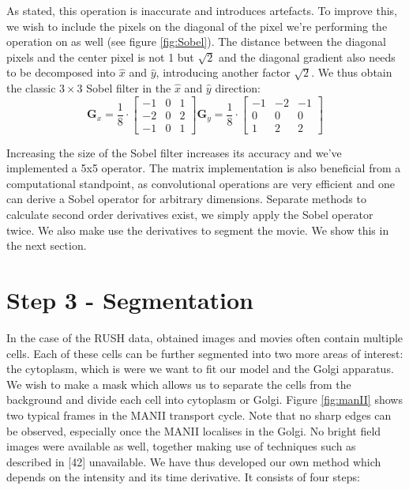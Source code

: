 \documentclass{Dissertate}
\begin{document}
As stated, this operation is inaccurate and introduces artefacts. To
improve this, we wish to include the pixels on the diagonal of the pixel
we're performing the operation on as well (see figure
\ref{fig:Sobel}). The distance between the diagonal pixels and the
center pixel is not 1 but \(\sqrt{2}\) and the diagonal gradient also
needs to be decomposed into \(\hat{x}\) and \(\hat{y}\), introducing
another factor \(\sqrt{2}\). We thus obtain the classic
\(3\times3\) Sobel filter in the $\hat{x}$ and $\hat{y}$ direction:  \[
\mathbf G_x=\frac{1}{8}\cdot
\begin{bmatrix}
-1 & 0 & 1\\
-2 & 0 & 2\\
-1 & 0 & 1
\end{bmatrix}
\mathbf G_y=\frac{1}{8}\cdot
\begin{bmatrix}
-1 & -2 & -1\\
0 & 0 & 0\\
1 & 2 & 2
\end{bmatrix}
\]

Increasing the size of the Sobel filter increases its accuracy and we've
implemented a 5x5 operator. The matrix implementation is also beneficial from a computational standpoint, as convolutional operations are very efficient and one can derive a Sobel operator for arbitrary dimensions. Separate methods to calculate second order derivatives exist, we simply apply the Sobel operator twice. We also make use the derivatives to segment the movie. We show this in the next section. 


\hypertarget{step-3---segmentation}{%
\section{Step 3 - Segmentation}\label{step-3---segmentation}}

In the case of the RUSH data, obtained images and movies often contain
multiple cells. Each of these cells can be further segmented into two
more areas of interest: the cytoplasm, which is were we want to fit our
model and the Golgi apparatus. We wish to make a mask which allows us to
separate the cells from the background and divide each
cell into cytoplasm or Golgi. Figure \ref{fig:manII} shows two
typical frames in the MANII transport cycle. Note that no sharp edges
can be observed, especially once the MANII localises in the Golgi. No
bright field images were available as well, together making use of
techniques such as described in [42] unavailable. We have thus developed our own method which depends on the intensity and its time derivative. It consists of four steps:
\end{document}
